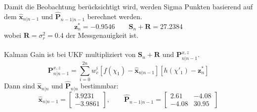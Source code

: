 Damit die Beobachtung berücksichtigt wird, werden Sigma Punkten basierend auf dem $\bm{\hat{x}}_{n|n-1}$ und $\bm{\hat{P}}_{n-1|n-1}$ berechnet werden.
\begin{equation*}
	\bm{z}_n^* = -0.9546 \qquad \bm{S}_n + \bm{R} = 27.2384
\end{equation*}
wobei $\bm{R} = \sigma_r^2 = 0.4$ der Messgenauigkeit ist. \\\\
Kalman Gain ist bei UKF multipliziert von $\bm{S}_n + \bm{R}$ und $\bm{P}_{n|n-1}^{x,z}$.
\begin{equation*}
	\bm{P}_{n|n-1}^{x,z} = \sum_{i=0}^{2n} w_c^{i}\left[f(\chi_1) - \bm{\hat{x}}_{n|n-1}\right] \left[h(\chi'_1) - \bm{z}_{n}^*\right]
\end{equation*}
Dann sind $\bm{\hat{x}}_{n|n}$ und $\bm{\hat{P}}_{n|n}$ bestimmbar:
\begin{equation*}
	\bm{\hat{x}}_{n|n-1} = \begin{bmatrix}
		3.9231\\
		-3.9861
	\end{bmatrix}, \qquad \bm{\hat{P}}_{n-1|n-1} = \begin{bmatrix}
		2.61 & -4.08 \\
		-4.08 & 30.95
	\end{bmatrix}
\end{equation*}
